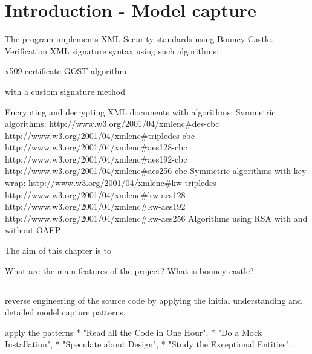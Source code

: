 \chapter{Introduction - Model capture}


The program implements XML Security standards using Bouncy Castle.
Verification XML signature syntax using such algorithms:

x509 certificate
GOST algorithm

with a custom signature method
 
Encrypting and decrypting XML documents with algorithms:
                          	Symmetric algorithms:
                                         	http://www.w3.org/2001/04/xmlenc#des-cbc
                                         	http://www.w3.org/2001/04/xmlenc#tripledes-cbc
                                         	http://www.w3.org/2001/04/xmlenc#aes128-cbc
http://www.w3.org/2001/04/xmlenc#aes192-cbc
http://www.w3.org/2001/04/xmlenc#aes256-cbc
                          	Symmetric algorithms with key wrap:
                                         	http://www.w3.org/2001/04/xmlenc#kw-tripledes
http://www.w3.org/2001/04/xmlenc#kw-aes128
http://www.w3.org/2001/04/xmlenc#kw-aes192
http://www.w3.org/2001/04/xmlenc#kw-aes256
                          	Algorithms using RSA with and without OAEP









The aim of this chapter is to 

What are the main features of the project?
What is bouncy castle?
























\section{}

reverse engineering of the source code by applying the initial understanding 
and detailed model capture patterns. 

apply the patterns 
* "Read all the Code in One Hour", 
* "Do a Mock Installation",  
* "Speculate about Design", 
* "Study the Exceptional Entities". 

